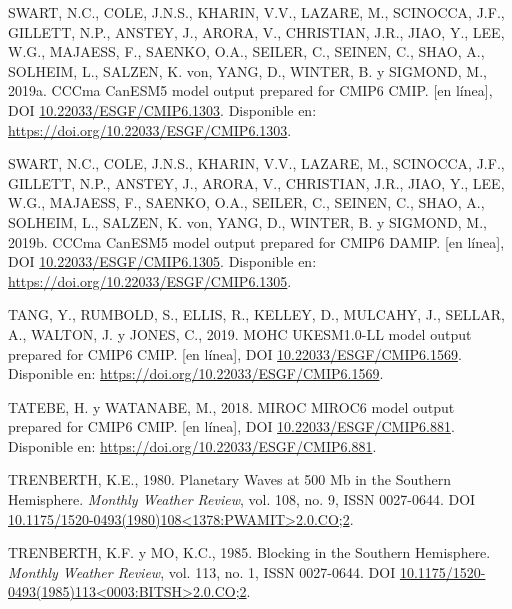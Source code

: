 \documentclass[12pt,oneside,a4paper]{reedthesis}
\newlength{\cslhangindent}
\newenvironment{CSLReferences}[2] %
 {%
  \setlength{\parindent}{0pt}
  \ifodd #1 \everypar{\setlength{\hangindent}{\cslhangindent}}\ignorespaces\fi
  \ifnum #2 > 0
  \setlength{\parskip}{#2\baselineskip}
  \fi
 }%
 {}
\begin{document}
\begin{CSLReferences}{1}{0}
\leavevmode{}%
SWART, N.C., COLE, J.N.S., KHARIN, V.V., LAZARE, M., SCINOCCA, J.F., GILLETT, N.P., ANSTEY, J., ARORA, V., CHRISTIAN, J.R., JIAO, Y., LEE, W.G., MAJAESS, F., SAENKO, O.A., SEILER, C., SEINEN, C., SHAO, A., SOLHEIM, L., SALZEN, K. von, YANG, D., WINTER, B. y SIGMOND, M., 2019a. CCCma CanESM5 model output prepared for CMIP6 CMIP. {[}en línea{]}, DOI \href{https://doi.org/10.22033/ESGF/CMIP6.1303}{10.22033/ESGF/CMIP6.1303}. Disponible en: \url{https://doi.org/10.22033/ESGF/CMIP6.1303}.

\leavevmode{}%
SWART, N.C., COLE, J.N.S., KHARIN, V.V., LAZARE, M., SCINOCCA, J.F., GILLETT, N.P., ANSTEY, J., ARORA, V., CHRISTIAN, J.R., JIAO, Y., LEE, W.G., MAJAESS, F., SAENKO, O.A., SEILER, C., SEINEN, C., SHAO, A., SOLHEIM, L., SALZEN, K. von, YANG, D., WINTER, B. y SIGMOND, M., 2019b. CCCma CanESM5 model output prepared for CMIP6 DAMIP. {[}en línea{]}, DOI \href{https://doi.org/10.22033/ESGF/CMIP6.1305}{10.22033/ESGF/CMIP6.1305}. Disponible en: \url{https://doi.org/10.22033/ESGF/CMIP6.1305}.

\leavevmode{}%
TANG, Y., RUMBOLD, S., ELLIS, R., KELLEY, D., MULCAHY, J., SELLAR, A., WALTON, J. y JONES, C., 2019. MOHC UKESM1.0-LL model output prepared for CMIP6 CMIP. {[}en línea{]}, DOI \href{https://doi.org/10.22033/ESGF/CMIP6.1569}{10.22033/ESGF/CMIP6.1569}. Disponible en: \url{https://doi.org/10.22033/ESGF/CMIP6.1569}.

\leavevmode{}%
TATEBE, H. y WATANABE, M., 2018. MIROC MIROC6 model output prepared for CMIP6 CMIP. {[}en línea{]}, DOI \href{https://doi.org/10.22033/ESGF/CMIP6.881}{10.22033/ESGF/CMIP6.881}. Disponible en: \url{https://doi.org/10.22033/ESGF/CMIP6.881}.

\leavevmode{}%
TRENBERTH, K.E., 1980. Planetary {Waves} at 500 Mb in the {Southern Hemisphere}. \emph{Monthly Weather Review}, vol. 108, no. 9, ISSN 0027-0644. DOI \href{https://doi.org/10.1175/1520-0493(1980)108\%3C1378:PWAMIT\%3E2.0.CO;2}{10.1175/1520-0493(1980)108\textless1378:PWAMIT\textgreater2.0.CO;2}.

\leavevmode{}%
TRENBERTH, K.F. y MO, K.C., 1985. Blocking in the {Southern Hemisphere}. \emph{Monthly Weather Review}, vol. 113, no. 1, ISSN 0027-0644. DOI \href{https://doi.org/10.1175/1520-0493(1985)113\%3C0003:BITSH\%3E2.0.CO;2}{10.1175/1520-0493(1985)113\textless0003:BITSH\textgreater2.0.CO;2}.


\end{CSLReferences}
\end{document}
